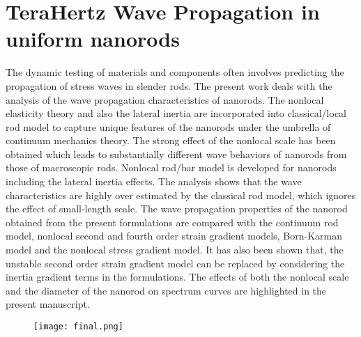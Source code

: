 \section{TeraHertz Wave Propagation in uniform nanorods}
The dynamic testing of materials and components often involves predicting the propagation of stress waves in slender rods. The present work deals with the analysis of the wave propagation characteristics of nanorods. The nonlocal elasticity theory and also the lateral inertia are incorporated into classical/local rod model to capture unique features of the nanorods under the umbrella of continuum mechanics theory.
The strong effect of the nonlocal scale has been obtained which leads to substantially different wave behaviors of nanorods from those of macroscopic rods. Nonlocal rod/bar model is developed for nanorods including the lateral inertia effects. The analysis shows that the wave characteristics are highly over
estimated by the classical rod model, which ignores the effect of small-length scale. The wave propagation properties of the nanorod obtained from the present formulations are compared with the continuum rod model, nonlocal second and fourth order strain gradient models, Born-Karman model and the nonlocal
stress gradient model. It has also been shown that, the unstable second order strain gradient model can be replaced by considering the inertia gradient terms in the formulations. The effects of both the nonlocal scale and the diameter of the nanorod on spectrum curves are highlighted in the present manuscript.


\begin {center}
\begin{figure}
\texttt{[image: final.png]}
\end {figure}
\end {center}
